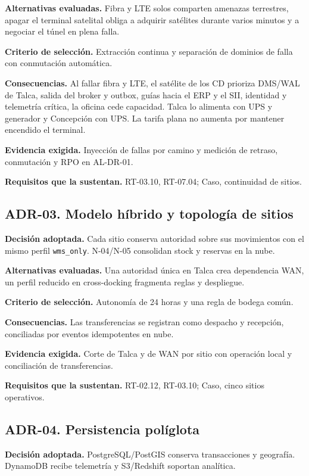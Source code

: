 \textbf{Alternativas evaluadas.} Fibra y LTE solos comparten amenazas terrestres, apagar el terminal satelital obliga a adquirir satélites durante varios minutos y a negociar el túnel en plena falla.

\textbf{Criterio de selección.} Extracción continua y separación de dominios de falla con conmutación automática.

\textbf{Consecuencias.} Al fallar fibra y LTE, el satélite de los CD prioriza DMS/WAL de Talca, salida del broker y outbox, guías hacia el ERP y el SII, identidad y telemetría crítica, la oficina cede capacidad. Talca lo alimenta con UPS y generador y Concepción con UPS. La tarifa plana no aumenta por mantener encendido el terminal.

\textbf{Evidencia exigida.} Inyección de fallas por camino y medición de retraso, conmutación y RPO en AL-DR-01.

\textbf{Requisitos que la sustentan.} RT-03.10, RT-07.04; Caso, continuidad de sitios.

\subsection*{ADR-03. Modelo híbrido y topología de sitios}
\label{sub:adr-03}
\textbf{Decisión adoptada.} Cada sitio conserva autoridad sobre sus movimientos con el mismo perfil \texttt{wms\_only}. N-04/N-05 consolidan stock y reservas en la nube.

\textbf{Alternativas evaluadas.} Una autoridad única en Talca crea dependencia WAN, un perfil reducido en cross-docking fragmenta reglas y despliegue.

\textbf{Criterio de selección.} Autonomía de 24 horas y una regla de bodega común.

\textbf{Consecuencias.} Las transferencias se registran como despacho y recepción, conciliadas por eventos idempotentes en nube.

\textbf{Evidencia exigida.} Corte de Talca y de WAN por sitio con operación local y conciliación de transferencias.

\textbf{Requisitos que la sustentan.} RT-02.12, RT-03.10; Caso, cinco sitios operativos.

\subsection*{ADR-04. Persistencia políglota}
\label{sub:adr-04}
\textbf{Decisión adoptada.} PostgreSQL/PostGIS conserva transacciones y geografía. DynamoDB recibe telemetría y S3/Redshift soportan analítica.

